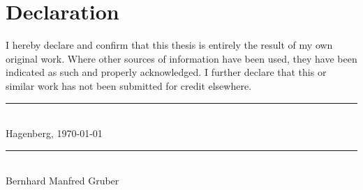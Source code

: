 \section*{Declaration}

I hereby declare and confirm that this thesis is entirely the result of my own original work. Where other sources of information have been used, they have been indicated as such and properly acknowledged. I further declare that this or similar work has not been submitted for credit elsewhere.

\vspace{2cm}

\parbox{7cm}{
	\centering
	\rule{6cm}{1pt}\\
	Hagenberg, \today 
}
\hfill
\parbox{7cm}{
	\centering
	\rule{6cm}{1pt}\\
	Bernhard Manfred Gruber
}